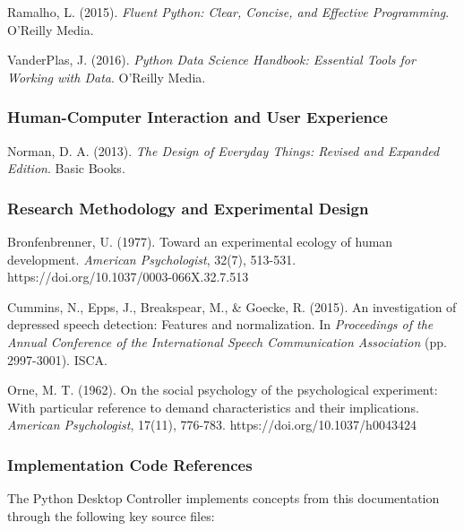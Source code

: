 \documentclass[11pt,a4paper]{article}
\begin{document}
Ramalho, L. (2015). \textit{Fluent Python: Clear, Concise, and Effective Programming}. O'Reilly Media.

VanderPlas, J. (2016). \textit{Python Data Science Handbook: Essential Tools for Working with Data}. O'Reilly Media.

\subsubsection{Human-Computer Interaction and User Experience}

Norman, D. A. (2013). \textit{The Design of Everyday Things: Revised and Expanded Edition}. Basic Books.

\subsubsection{Research Methodology and Experimental Design}

Bronfenbrenner, U. (1977). Toward an experimental ecology of human development. \textit{American Psychologist}, 32(7),
513-531. https://doi.org/10.1037/0003-066X.32.7.513

Cummins, N., Epps, J., Breakspear, M., \& Goecke, R. (2015). An investigation of depressed speech detection: Features and
normalization. In \textit{Proceedings of the Annual Conference of the International Speech Communication Association} (pp.
2997-3001). ISCA.

Orne, M. T. (1962). On the social psychology of the psychological experiment: With particular reference to demand
characteristics and their implications. \textit{American Psychologist}, 17(11), 776-783. https://doi.org/10.1037/h0043424

\subsubsection{Implementation Code References}

The Python Desktop Controller implements concepts from this documentation through the following key source files:
\end{document}
